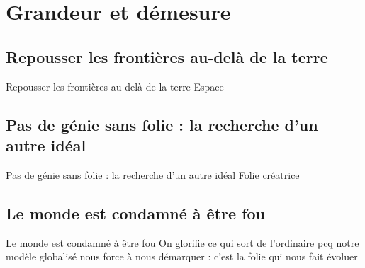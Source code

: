 \documentclass{beamer}
\begin{document}
\section{Grandeur et démesure}

\subsection{Repousser les frontières au-delà de la terre}
\begin{frame}{Repousser les frontières au-delà de la terre}
  Espace
\end{frame}

\subsection{Pas de génie sans folie : la recherche d'un autre idéal}
\begin{frame}{Pas de génie sans folie : la recherche d'un autre idéal}
  Folie créatrice
\end{frame}

\subsection{Le monde est condamné à être fou}
\begin{frame}{Le monde est condamné à être fou}
  On glorifie ce qui sort de l'ordinaire pcq notre modèle globalisé nous force à nous démarquer : c'est la folie qui nous fait évoluer
\end{frame}
\end{document}

